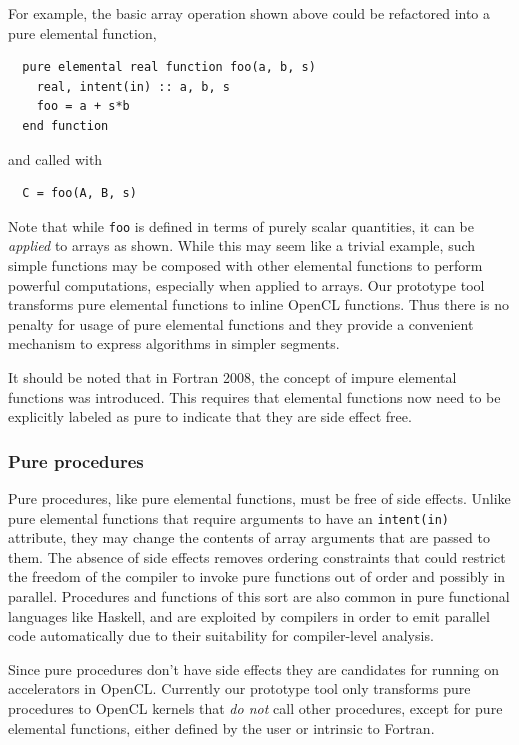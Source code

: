 For example, the basic array operation shown above could be refactored into a pure
elemental function,

{\small
\begin{verbatim}
  pure elemental real function foo(a, b, s)
    real, intent(in) :: a, b, s
    foo = a + s*b
  end function
\end{verbatim}
}

\noindent and called with

{\small
\begin{verbatim}
  C = foo(A, B, s)
\end{verbatim}
}

Note that while {\tt foo} is defined in terms of purely scalar quantities, it
can be \emph{applied} to arrays as shown.  While this may seem like a trivial
example, such simple functions may be composed with other elemental functions to
perform powerful computations, especially when applied to arrays.  Our prototype
tool transforms pure elemental functions to inline OpenCL functions.  Thus there is
no penalty for usage of pure elemental functions and they provide a convenient
mechanism to express algorithms in simpler segments.

It should be noted that in Fortran 2008,
the concept of impure elemental functions was introduced.  This requires that
elemental functions now need to be explicitly labeled as pure to indicate that they
are side effect free.

\subsubsection*{Pure procedures}

Pure procedures, like pure elemental functions, must be free of side effects.  Unlike
pure elemental functions that require arguments to have an {\tt intent(in)}
attribute, they may change the contents of array arguments that are passed to
them.  The absence of side effects removes ordering constraints that could
restrict the freedom of the compiler to invoke pure functions out of order and
possibly in parallel.  Procedures and functions of this sort are also common in
pure functional languages like Haskell, and are exploited by compilers in order
to emit parallel code automatically due to their suitability for compiler-level
analysis.

Since pure procedures don't have side effects they are candidates for running on
accelerators in OpenCL.  Currently our prototype tool only transforms pure procedures
to OpenCL kernels that \emph{do not} call other procedures, except for pure elemental
functions, either defined by the user or intrinsic to Fortran.

